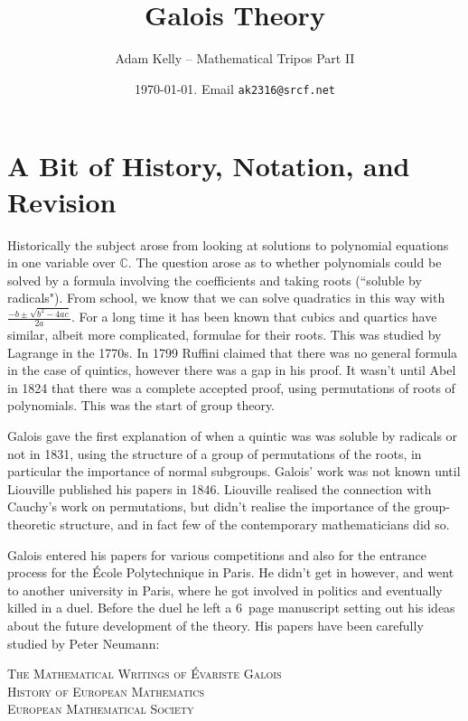 \documentclass[a4paper, 10pt, twocolumn]{amsart}
\title{Galois Theory}
\author{Adam Kelly -- Mathematical Tripos Part II}
\date{\today. Email \texttt{ak2316@srcf.net}}
\begin{document}
\maketitle

\section{A Bit of History, Notation, and Revision}
Historically the subject arose from looking at solutions to polynomial equations in one variable over $\mathbb{C}$. The question arose as to whether polynomials could be solved by a formula involving the coefficients and taking roots (``soluble by radicals"). From school, we know that we can solve quadratics in this way with $\frac{-b\pm\sqrt{b^2-4ac}}{2a}$. For a long time it has been known that cubics and quartics have similar, albeit more complicated, formulae for their roots. This was studied by Lagrange in the 1770s. In 1799 Ruffini claimed that there was no general formula in the case of quintics, however there was a gap in his proof. It wasn't until Abel in 1824 that there was a complete accepted proof, using permutations of roots of polynomials. This was the start of group theory.

Galois gave the first explanation of when a quintic was was soluble by radicals or not in 1831, using the structure of a group of permutations of the roots, in particular the importance of normal subgroups. Galois' work was not known until Liouville published his papers in 1846. Liouville realised the connection with Cauchy's work on permutations, but didn't realise the importance of the group-theoretic structure, and in fact few of the contemporary mathematicians did so.

Galois entered his papers for various competitions and also for the entrance process for the \'Ecole Polytechnique in Paris. He didn't get in however, and went to another university in Paris, where he got involved in politics and eventually killed in a duel. Before the duel he left a 6\textonehalf\, page manuscript setting out his ideas about the future development of the theory. His papers have been carefully studied by Peter Neumann:
\begin{center}
\textsc{
The Mathematical Writings of \'Evariste Galois\\History of European Mathematics\\European Mathematical Society
}
\end{center}
\end{document}
